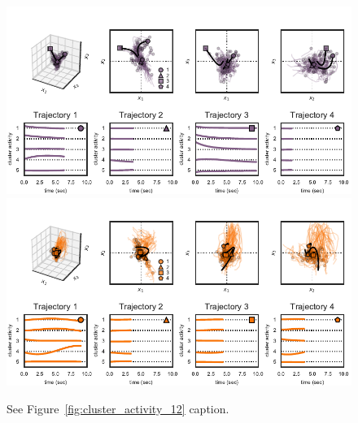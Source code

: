 \documentclass{article}
\begin{document}
\begin{figure}[h]
\centering
\includegraphics[width=5in]{figures/arhmm/cluster_activity_4.pdf}
\includegraphics[width=5in]{figures/arhmm/cluster_activity_5.pdf}
\caption{See Figure~\ref{fig:cluster_activity_12} caption.}
\label{fig:cluster_activity_56}
\end{figure}
\end{document}
